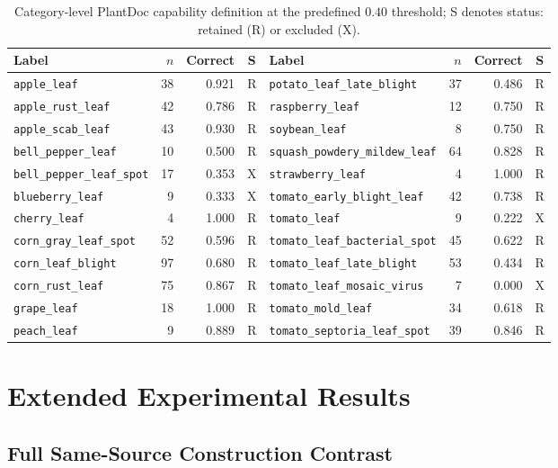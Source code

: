 \documentclass[letterpaper]{article}
\begin{document}
\begin{table}[t]
\centering
\small
\setlength{\tabcolsep}{1mm}
\begin{tabular}{lrrclrrc}
\toprule
Label & $n$ & Correct & S & Label & $n$ & Correct & S \\
\midrule
\texttt{apple\_leaf} & 38 & 0.921 & R &
\texttt{potato\_leaf\_late\_blight} & 37 & 0.486 & R \\
\texttt{apple\_rust\_leaf} & 42 & 0.786 & R &
\texttt{raspberry\_leaf} & 12 & 0.750 & R \\
\texttt{apple\_scab\_leaf} & 43 & 0.930 & R &
\texttt{soybean\_leaf} & 8 & 0.750 & R \\
\texttt{bell\_pepper\_leaf} & 10 & 0.500 & R &
\texttt{squash\_powdery\_mildew\_leaf} & 64 & 0.828 & R \\
\texttt{bell\_pepper\_leaf\_spot} & 17 & 0.353 & X &
\texttt{strawberry\_leaf} & 4 & 1.000 & R \\
\texttt{blueberry\_leaf} & 9 & 0.333 & X &
\texttt{tomato\_early\_blight\_leaf} & 42 & 0.738 & R \\
\texttt{cherry\_leaf} & 4 & 1.000 & R &
\texttt{tomato\_leaf} & 9 & 0.222 & X \\
\texttt{corn\_gray\_leaf\_spot} & 52 & 0.596 & R &
\texttt{tomato\_leaf\_bacterial\_spot} & 45 & 0.622 & R \\
\texttt{corn\_leaf\_blight} & 97 & 0.680 & R &
\texttt{tomato\_leaf\_late\_blight} & 53 & 0.434 & R \\
\texttt{corn\_rust\_leaf} & 75 & 0.867 & R &
\texttt{tomato\_leaf\_mosaic\_virus} & 7 & 0.000 & X \\
\texttt{grape\_leaf} & 18 & 1.000 & R &
\texttt{tomato\_mold\_leaf} & 34 & 0.618 & R \\
\texttt{peach\_leaf} & 9 & 0.889 & R &
\texttt{tomato\_septoria\_leaf\_spot} & 39 & 0.846 & R \\
\bottomrule
\end{tabular}
\caption{Category-level PlantDoc capability definition at the predefined $0.40$ threshold; S denotes status: retained (R) or excluded (X).}
\label{tab:plantdoc_capability}
\end{table}

\section{Extended Experimental Results}

\subsection{Full Same-Source Construction Contrast}
\label{sec:grouping_ablation_full}
\end{document}
